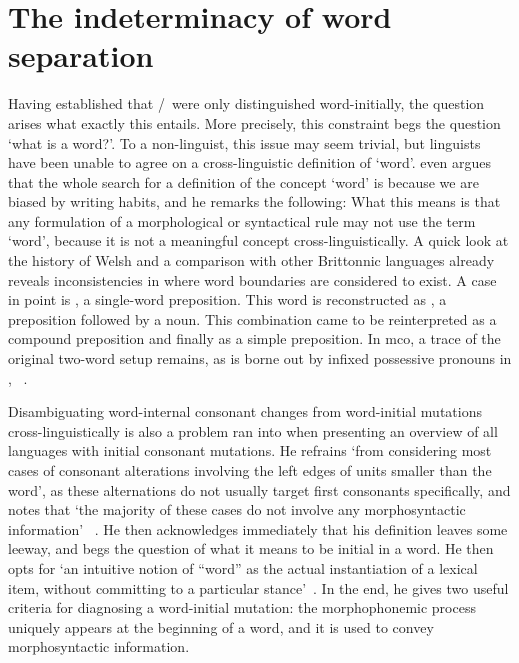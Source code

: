 \section{The indeterminacy of word separation}
\label{sec:indet-word-separ}
Having established that \lT/\xD\ were only distinguished word-initially, the question arises what exactly this entails. More precisely, this constraint begs the question `what is a word?'.
To a non-linguist, this issue may seem trivial, but linguists have been unable to agree on a cross-linguistic definition of `word'.
\Textcite[28]{haspelmath_indeterminacy_2011} even argues that the whole search for a definition of the concept `word' is because we are biased by writing habits, and he remarks the following: 
What this means is that any formulation of a morphological or syntactical rule may not use the term `word', because it is not a meaningful concept cross-linguistically. 
A quick look at the history of Welsh and a comparison with other Brittonnic languages already reveals inconsistencies in where word boundaries are considered to exist.
A case in point is , a single-word preposition.
This word is reconstructed as  \autocite[258]{schrijver_studies_1995}, a preposition followed by a noun.
This combination came to be reinterpreted as a compound preposition and finally as a simple preposition.
In \gls{mco}, a trace of the original two-word setup remains, as is borne out by infixed possessive pronouns in , \etc~\autocite[120]{koch_neo-brittonic_1989}.

Disambiguating word-internal consonant changes from word-initial mutations cross-linguistically is also a problem \textcite{iosad_right_2010} ran into when presenting an overview of all languages with initial consonant mutations.
He refrains `from considering most cases of consonant alterations involving the left edges of units smaller than the word', as these alternations do not usually target first consonants specifically, and notes that `the majority of these cases do not involve any morphosyntactic information' ~\autocite[108]{iosad_right_2010}.
He then acknowledges immediately that his definition leaves some leeway, and begs the question of what it means to be initial in a word.
He then opts for `an intuitive notion of ``word'' as the actual instantiation of a lexical item, without committing to a particular stance'~\autocite[109]{iosad_right_2010}.
In the end, he gives two useful criteria for diagnosing a word-initial mutation: the morphophonemic process uniquely appears at the beginning of a word, and it is used to convey morphosyntactic information.

